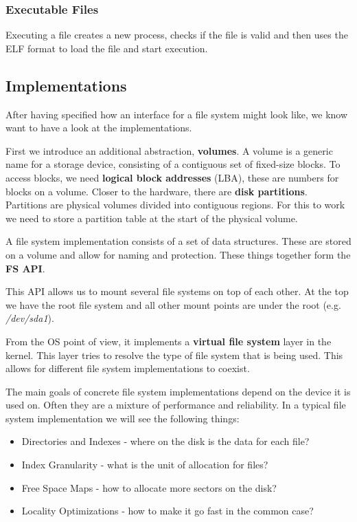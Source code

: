 \subsubsection{Executable Files}

Executing a file creates a new process, checks if the file is valid and then uses the ELF format to load the file and start execution.


\subsection{Implementations}

After having specified how an interface for a file system might look like, we know want to have a look at the implementations. \medskip

First we introduce an additional abstraction, \textbf{volumes}. A volume is a generic name for a storage device, consisting of a contiguous set of fixed-size blocks. To access blocks, we need \textbf{logical block addresses} (LBA), these are numbers for blocks on a volume. Closer to the hardware, there are \textbf{disk partitions}. Partitions are physical volumes divided into contiguous regions. For this to work we need to store a partition table at the start of the physical volume. \medskip

A file system implementation consists of a set of data structures. These are stored on a volume and allow for naming and protection. These things together form the \textbf{FS API}. \medskip

This API allows us to mount several file systems on top of each other. At the top we have the root file system and all other mount points are under the root (e.g. \textit{/dev/sda1}). \medskip

From the OS point of view, it implements a \textbf{virtual file system} layer in the kernel. This layer tries to resolve the type of file system that is being used. This allows for different file system implementations to coexist. \medskip

The main goals of concrete file system implementations depend on the device it is used on. Often they are a mixture of performance and reliability. In a typical file system implementation we will see the following things:
\begin{itemize}
	\item Directories and Indexes - where on the disk is the data for each file?
	\item Index Granularity - what is the unit of allocation for files?
	\item Free Space Maps - how to allocate more sectors on the disk?
	\item Locality Optimizations - how to make it go fast in the common case?
\end{itemize}

